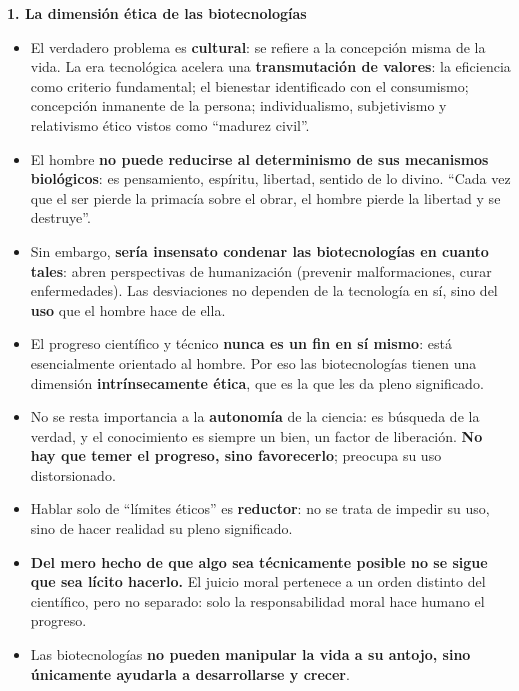 \documentclass[10pt,a4paper]{article}
\begin{document}
\medskip\noindent \textbf{1. La dimensión ética de las biotecnologías}\par\nopagebreak
\begin{itemize}
\item El verdadero problema es \textbf{cultural}: se refiere a la concepción misma de la vida. La era tecnológica acelera una \textbf{transmutación de valores}: la eficiencia como criterio fundamental; el bienestar identificado con el consumismo; concepción inmanente de la persona; individualismo, subjetivismo y relativismo ético vistos como ``madurez civil''.
\item El hombre \textbf{no puede reducirse al determinismo de sus mecanismos biológicos}: es pensamiento, espíritu, libertad, sentido de lo divino. ``Cada vez que el ser pierde la primacía sobre el obrar, el hombre pierde la libertad y se destruye''.
\item Sin embargo, \textbf{sería insensato condenar las biotecnologías en cuanto tales}: abren perspectivas de humanización (prevenir malformaciones, curar enfermedades). Las desviaciones no dependen de la tecnología en sí, sino del \textbf{uso} que el hombre hace de ella.
\item El progreso científico y técnico \textbf{nunca es un fin en sí mismo}: está esencialmente orientado al hombre. Por eso las biotecnologías tienen una dimensión \textbf{intrínsecamente ética}, que es la que les da pleno significado.
\item No se resta importancia a la \textbf{autonomía} de la ciencia: es búsqueda de la verdad, y el conocimiento es siempre un bien, un factor de liberación. \textbf{No hay que temer el progreso, sino favorecerlo}; preocupa su uso distorsionado.
\item Hablar solo de ``límites éticos'' es \textbf{reductor}: no se trata de impedir su uso, sino de hacer realidad su pleno significado.
\item \textbf{Del mero hecho de que algo sea técnicamente posible no se sigue que sea lícito hacerlo.} El juicio moral pertenece a un orden distinto del científico, pero no separado: solo la responsabilidad moral hace humano el progreso.
\item Las biotecnologías \textbf{no pueden manipular la vida a su antojo, sino únicamente ayudarla a desarrollarse y crecer}.
\end{itemize}
\end{document}
